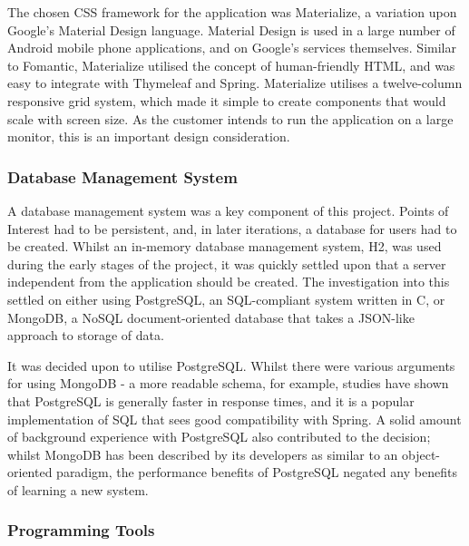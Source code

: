 The chosen CSS framework for the application was Materialize, a variation upon Google's Material Design language. Material Design is used in a large number of Android mobile phone applications, and on Google's services themselves. Similar to Fomantic, Materialize utilised the concept of human-friendly HTML, and was easy to integrate with Thymeleaf and Spring. Materialize utilises a twelve-column responsive grid system, which made it simple to create components that would scale with screen size. As the customer intends to run the application on a large monitor, this is an important design consideration.

\subsubsection{Database Management System}

A database management system was a key component of this project. Points of Interest had to be persistent, and, in later iterations, a database for users had to be created. Whilst an in-memory database management system, H2, was used during the early stages of the project, it was quickly settled upon that a server independent from the application should be created. The investigation into this settled on either using PostgreSQL, an SQL-compliant system written in C, or MongoDB, a NoSQL document-oriented database that takes a JSON-like approach to storage of data.

It was decided upon to utilise PostgreSQL. Whilst there were various arguments for using MongoDB - a more readable schema, for example, studies have shown that PostgreSQL is generally faster in response times, and it is a popular implementation of SQL that sees good compatibility with Spring. A solid amount of background experience with PostgreSQL also contributed to the decision; whilst MongoDB has been described by its developers as similar to an object-oriented paradigm, the performance benefits of PostgreSQL negated any benefits of learning a new system.


\subsubsection{Programming Tools}

